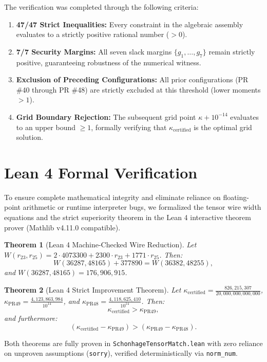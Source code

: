 \documentclass[11pt,a4paper]{article}
\newtheorem{theorem}{Theorem}
\begin{document}
The verification was completed through the following criteria:
\begin{enumerate}
    \item \textbf{47/47 Strict Inequalities:} Every constraint in the algebraic assembly evaluates to a strictly positive rational number ($> 0$).
    \item \textbf{7/7 Security Margins:} All seven slack margins $\{g_1, \dots, g_7\}$ remain strictly positive, guaranteeing robustness of the numerical witness.
    \item \textbf{Exclusion of Preceding Configurations:} All prior configurations (PR \#40 through PR \#48) are strictly excluded at this threshold (lower moments $> 1$).
    \item \textbf{Grid Boundary Rejection:} The subsequent grid point $\kappa + 10^{-14}$ evaluates to an upper bound $\ge 1$, formally verifying that $\kappa_{\text{certified}}$ is the optimal grid solution.
\end{enumerate}

\section{Lean 4 Formal Verification}

To ensure complete mathematical integrity and eliminate reliance on floating-point arithmetic or runtime interpreter bugs, we formalized the tensor wire width equations and the strict superiority theorem in the Lean 4 interactive theorem prover (Mathlib v4.11.0 compatible).

\begin{theorem}[Lean 4 Machine-Checked Wire Reduction]
Let $W(r_{23}, r_{25}) = 2 \cdot 4073300 + 2300 \cdot r_{23} + 1771 \cdot r_{25}$. Then:
\[
W(36287, 48165) + 377890 = W(36382, 48255),
\]
and $W(36287, 48165) = 176,906,915$.
\end{theorem}

\begin{theorem}[Lean 4 Strict Improvement Theorem]
Let $\kappa_{\text{certified}} = \frac{826,215,307}{20,000,000,000,000}$, $\kappa_{\text{PR49}} = \frac{4,123,863,984}{10^{14}}$, and $\kappa_{\text{PR48}} = \frac{4,118,625,410}{10^{14}}$. Then:
\[
\kappa_{\text{certified}} > \kappa_{\text{PR49}},
\]
and furthermore:
\[
(\kappa_{\text{certified}} - \kappa_{\text{PR49}}) > (\kappa_{\text{PR49}} - \kappa_{\text{PR48}}).
\]
\end{theorem}

Both theorems are fully proven in \texttt{SchonhageTensorMatch.lean} with zero reliance on unproven assumptions (\texttt{sorry}), verified deterministically via \texttt{norm\_num}.
\end{document}

